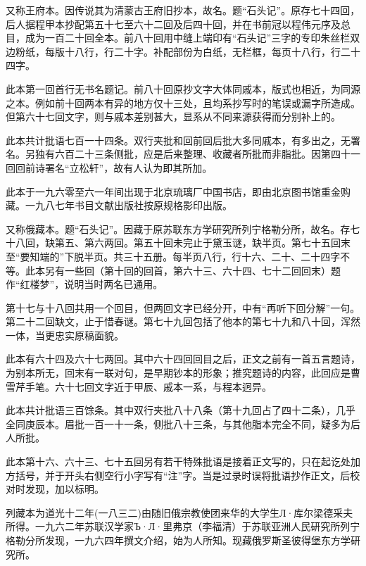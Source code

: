 又称王府本。因传说其为清蒙古王府旧抄本，故名。题“石头记”。原存七十四回，后人据程甲本抄配第五十七至六十二回及后四十回，并在书前冠以程伟元序及总目，成为一百二十回全本。前八十回用中缝上端印有“石头记”三字的专印朱丝栏双边粉纸，每版十八行，行二十字。补配部份为白纸，无栏框，每页十八行，行二十四字。

此本第一回首行无书名题记。前八十回原抄文字大体同戚本，版式也相近，为同源之本。例如前十回两本有异的地方仅十三处，且均系抄写时的笔误或漏字所造成。但第六十七回文字，则与戚本差别甚大，显系从不同来源获得而分别补上的。

此本共计批语七百一十四条。双行夹批和回前回后批大多同戚本，有多出之，无署名。另独有六百二十三条侧批，应是后来整理、收藏者所批而非脂批。因第四十一回回前诗署名“立松轩”，故有人认为即其所加。

此本于一九六零至六一年间出现于北京琉璃厂中国书店，即由北京图书馆重金购藏。一九八七年书目文献出版社按原规格影印出版。

{}

又称俄藏本。题“石头记”。因藏于原苏联东方学研究所列宁格勒分所，故名。存七十八回，缺第五、第六两回。第五十回未完止于黛玉谜，缺半页。第七十五回末至“要知端的”下脱半页。共三十五册。每半页八行，行十六、二十、二十四字不等。此本另有一些回（第十回的回首，第六十三、六十四、七十二回回末）题作“红楼梦”，说明当时两名已通用。

第十七与十八回共用一个回目，但两回文字已经分开，中有“再听下回分解”一句。第二十二回缺文，止于惜春谜。第七十九回包括了他本的第七十九和八十回，浑然一体，当更忠实原稿面貌。

此本有六十四及六十七两回。其中六十四回回目之后，正文之前有一首五言题诗，为别本所无，回末有一联对句，是早期钞本的形象；推究题诗的内容，此回应是曹雪芹手笔。六十七回文字近于甲辰、戚本一系，与程本迥异。

此本共计批语三百馀条。其中双行夹批八十八条（第十九回占了四十二条），几乎全同庚辰本。眉批一百一十一条，侧批八十三条，与其他脂本完全不同，疑多为后人所批。

此本第十六、六十三、七十五回另有若干特殊批语是接着正文写的，只在起讫处加方括号，并于开头右侧空行小字写有“注”字。当是过录时误将批语抄作正文，后校对时发现，加以标明。

列藏本为道光十二年(一八三二)由随旧俄宗教使团来华的大学生Л·库尔梁德采夫所得。一九六二年苏联汉学家Ъ·Л·里弗京（李福清）于苏联亚洲人民研究所列宁格勒分所发现，一九六四年撰文介绍，始为人所知。现藏俄罗斯圣彼得堡东方学研究所。

